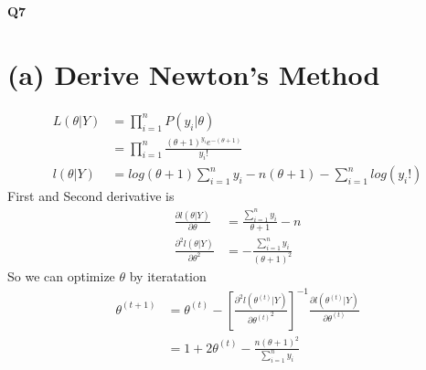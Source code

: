 \documentclass[11pt]{article}
\begin{document}
%

\newcommand{\Ito}{$It\hat{o}$'$s~Lemma$}

\newcommand\ind{\stackrel{\rm ind}{\sim}}
\newcommand\iid{\stackrel{\rm iid}{\sim}}
\renewcommand\c{\mathbf{c}}
\newcommand\y{\mathbf{y}}
\newcommand\z{\mathbf{z}}
\renewcommand\P{\mathbf{P}}
\newcommand\W{\mathbf{W}}
\newcommand\X{\mathbf{X}}
\newcommand\Y{\mathbf{Y}}
\newcommand\Z{\mathbf{Z}}
\newcommand\J{{\cal J}}
\newcommand\B{{\cal B}}
\newcommand\K{{\cal K}}
\newcommand\N{{\rm N}}
\newcommand\bs{\boldsymbol}
\newcommand\bth{\bs\theta}
\newcommand\bbe{\bs\beta}
\renewcommand\*{^\star}

\def\spacingset#1{\renewcommand{\baselinestretch}%
{#1}\small\normalsize} \spacingset{1}



  \bigskip
  \bigskip
  \bigskip
  \begin{center}
    {\LARGE\bf Q7}
  \end{center}
  \medskip



\spacingset{1.45}






\section*{(a) Derive Newton's Method}
\begin{align*}
L(\theta | Y) &= \prod_{i=1}^{n} P (y_i | \theta)\\
& = \prod_{i=1}^{n} \frac{(\theta+1)^{y_i} e ^{-(\theta + 1)}}{y_i !}\\
l(\theta | Y) &= log(\theta+1)\sum_{i=1}^{n}y_i -n(\theta +1) - \sum_{i=1}^{n} log(y_i!)
\end{align*}
First and Second derivative is
\begin{align*}
\frac{\partial l(\theta|Y)}{\partial \theta} &=\frac{\sum_{i=1}^{n}y_i}{\theta +1} - n\\
\frac{\partial^2 l(\theta|Y)}{\partial \theta^2}&= - \frac{\sum_{i=1}^{n}y_i}{(\theta + 1)^2}
\end{align*}
So we can optimize $\theta$ by iteratation
\begin{align*}
\theta^{(t+1)} &= \theta^{(t)} - \left[ \frac{\partial^2 l(\theta^{(t)}|Y)}{\partial {\theta^{(t)}}^2}\right]^{-1} \frac{\partial l(\theta^{(t)} | Y)}{\partial \theta^{(t)}}\\
&= 1 + 2\theta^{(t)} - \frac{n(\theta+1)^2}{\sum_{i=1}^{n}y_i}
\end{align*}
\end{document}
